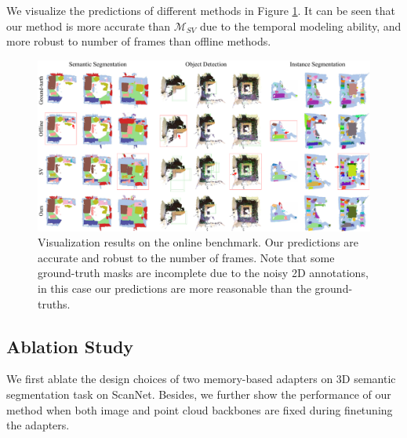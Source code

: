 We visualize the predictions of different methods in Figure \ref{vis}. 
It can be seen that our method is more accurate than $\mathcal{M}_{SV}$ due to the temporal modeling ability, and more robust to number of frames than offline methods.

\begin{figure}[t]
    \centering
    \vspace{-1mm}
    \includegraphics[width=\linewidth]{figures/exp.pdf}
    \caption{Visualization results on the online benchmark. Our predictions are accurate and robust to the number of frames. Note that some ground-truth masks are incomplete due to the noisy 2D annotations, in this case our predictions are more reasonable than the ground-truths.}
    \label{vis}
\end{figure}

\subsection{Ablation Study}
We first ablate the design choices of two memory-based adapters on 3D semantic segmentation task on ScanNet. 
Besides, we further show the performance of our method when both image and point cloud backbones are fixed during finetuning the adapters. 

